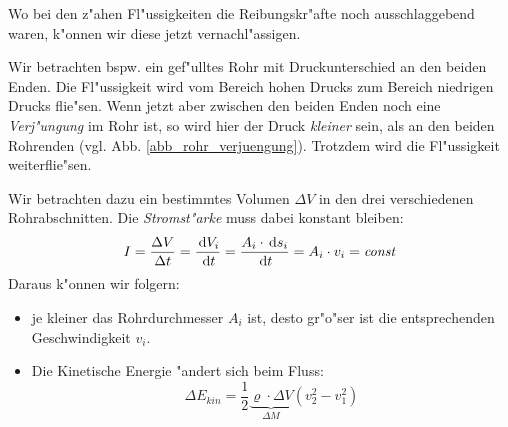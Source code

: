 Wo bei den z"ahen Fl"ussigkeiten die Reibungskr"afte noch ausschlaggebend
waren, k"onnen wir diese jetzt vernachl"assigen.

Wir betrachten bspw. ein gef"ulltes Rohr mit Druckunterschied an den
beiden Enden. Die Fl"ussigkeit wird vom Bereich hohen Drucks zum
Bereich niedrigen Drucks flie"sen. Wenn jetzt aber zwischen den beiden
Enden noch eine \emph{Verj"ungung} im Rohr ist, so wird hier der Druck
\emph{kleiner} sein, als an den beiden Rohrenden
(vgl. Abb. \ref{abb_rohr_verjuengung}). Trotzdem wird die Fl"ussigkeit
weiterflie"sen.

Wir betrachten dazu ein bestimmtes Volumen $\Delta  V$ in den drei
verschiedenen Rohrabschnitten. Die \emph{Stromst"arke} muss dabei
konstant bleiben: 
\begin{equation}
   \label{eq:81}
   I = \frac{\Delta V}{\Delta t} = \frac{\, \mathrm{d} V_i}{\, \mathrm{d} t} = \frac{A_i \cdot \, \mathrm{d} s_i}{\, \mathrm{d} t} =
A_i \cdot v_i = \text{\emph{const}}
\end{equation}
Daraus k"onnen wir folgern:
\begin{itemize}
\item je kleiner das Rohrdurchmesser $A_i$ ist, desto gr"o"ser ist die
   entsprechenden Geschwindigkeit $v_i$.
\item Die Kinetische Energie "andert sich beim Fluss:
   \begin{equation}
      \label{eq:82}
      \Delta E_{kin} = \frac{1}{2} \underbrace{\varrho \cdot \Delta
        V}_{\Delta M} ( v_2^2 - v_1^2 )
   \end{equation}
\end{itemize}

